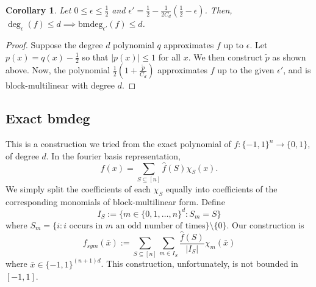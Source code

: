 \documentclass[12pt]{report}
\newtheorem*{corollary}{Corollary}
\newcommand{\bmdeg}{\mathrm{bmdeg}}
\begin{document}
\begin{corollary}
Let $0 \leq \epsilon \leq \frac{1}{2}$ and $\epsilon' = \frac{1}{2} - \frac{1}{2 C_d}\left(\frac{1}{2} - \epsilon\right)$. Then, $\deg_\epsilon(f) \leq d \implies \bmdeg_{\epsilon'}(f) \leq d$.
\end{corollary}
\begin{proof}
Suppose the degree $d$ polynomial $q$ approximates $f$ up to $\epsilon$. Let $p(x) = q(x) - \frac{1}{2}$ so that $|p(x)| \leq 1$ for all $x$. We then construct $\tilde{p}$ as shown above. Now, the polynomial $\frac{1}{2}\left(1 + \frac{\tilde{p}}{C_d}\right)$ approximates $f$ up to the given $\epsilon'$, and is block-multilinear with degree $d$.
\end{proof}

\subsection{Exact bmdeg}
This is a construction we tried from the exact polynomial of $f\colon \{-1,1\}^n\rightarrow \{0,1\}$, of degree $d$. In the fourier basis representation,
$$f(x) = \sum_{S\subseteq [n]} \hat{f}(S) \chi_S(x).$$ We simply split the coefficients of each $\chi_S$ equally into coefficients of the corresponding monomials of block-multilinear form. Define
\begin{equation}
    I_S := \{m\in \{0,1,\ldots,n\}^d\colon S_m = S\}
\end{equation}
where $S_m = \{i\colon i\text{ occurs in }m\text{ an odd number of times} \}\setminus \{0\}$. Our construction is
\begin{equation}
f_{sym}(\bar{x}) := \sum_{S\subseteq [n]} \sum_{m\in I_S} \frac{\hat{f}(S)}{|I_S|} \chi_m(\bar{x})
\end{equation}
where $\bar{x}\in \{-1,1\}^{(n+1)d}$. This construction, unfortunately, is not bounded in $[-1,1]$.
\end{document}
